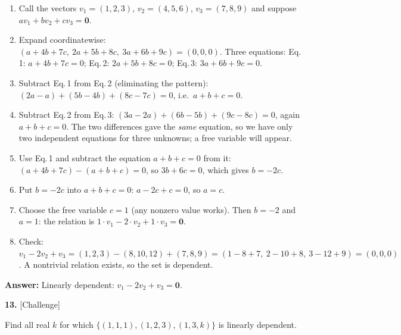 \documentclass[11pt]{article}
\begin{document}
\begin{tcolorbox}[breakable,colback=ans,colframe=ansb,boxrule=0.5pt,left=4pt,right=4pt,top=2pt,bottom=2pt]\begin{enumerate}[leftmargin=2.2em,itemsep=1pt,topsep=1pt,label=\textbf{Step \arabic*.}]\item Call the vectors $v_1=(1,2,3)$, $v_2=(4,5,6)$, $v_3=(7,8,9)$ and suppose $av_1+bv_2+cv_3=\mathbf 0$.
\item Expand coordinatewise: $(a+4b+7c,\ 2a+5b+8c,\ 3a+6b+9c)=(0,0,0)$. Three equations: Eq.\,1: $a+4b+7c=0$; Eq.\,2: $2a+5b+8c=0$; Eq.\,3: $3a+6b+9c=0$.
\item Subtract Eq.\,1 from Eq.\,2 (eliminating the pattern): $(2a-a)+(5b-4b)+(8c-7c)=0$, i.e.\ $a+b+c=0$.
\item Subtract Eq.\,2 from Eq.\,3: $(3a-2a)+(6b-5b)+(9c-8c)=0$, again $a+b+c=0$. The two differences gave the \emph{same} equation, so we have only two independent equations for three unknowns; a free variable will appear.
\item Use Eq.\,1 and subtract the equation $a+b+c=0$ from it: $(a+4b+7c)-(a+b+c)=0$, so $3b+6c=0$, which gives $b=-2c$.
\item Put $b=-2c$ into $a+b+c=0$: $a-2c+c=0$, so $a=c$.
\item Choose the free variable $c=1$ (any nonzero value works). Then $b=-2$ and $a=1$: the relation is $1\cdot v_1-2\cdot v_2+1\cdot v_3=\mathbf 0$.
\item Check: $v_1-2v_2+v_3=(1,2,3)-(8,10,12)+(7,8,9)=(1-8+7,\ 2-10+8,\ 3-12+9)=(0,0,0)$ \checkmark. A nontrivial relation exists, so the set is dependent.
\end{enumerate}\textbf{Answer:} Linearly dependent: $v_1-2v_2+v_3=\mathbf 0$.\end{tcolorbox}
\par\vspace{2pt}
\begin{minipage}{\linewidth}\textbf{13.} \hfill{\scriptsize\color{ink}[Challenge]}\par\nopagebreak Find all real $k$ for which $\{(1,1,1),(1,2,3),(1,3,k)\}$ is linearly dependent.
\end{minipage}\par\nopagebreak
\end{document}
